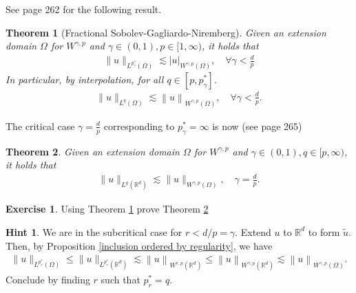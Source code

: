 \documentclass[
    a4paper,
    DIV=14,
    abstract=true,
    numbers=noenddot
]
{scrartcl}
\newtheorem{theorem}{Theorem}[section]
\theoremstyle{definition}
\newtheorem{exercise}{Exercise}
\newtheorem*{hint}{Hint}
\newcommand{\tl}[1]{\widetilde{#1}}
\renewcommand{\norm}[1]{\left\lVert #1 \right\rVert}\renewcommand{\abs}[1]{\left| #1 \right|}
\newcommand{\R}{\mathbb{R}}
\begin{document}
See \cite{leoni2023first} page 262 for the following result.
\begin{theorem}[Fractional Sobolev-Gagliardo-Niremberg]\label{subcritical embedding}
  Given an extension domain $\Omega $ for $W^{\gamma,p}$ and $\gamma \in (0,1), p \in [1,\infty)$, it holds that
  \begin{align*}
    \|u\|_{L^{p_\gamma^*}(\Omega )} \lesssim |u|_{W^{\gamma, p}(\Omega )}, \quad\forall \gamma <  \frac{d}{p}
  \end{align*}
  In particular, by interpolation, for all $q \in [p,p_\gamma^*]$.
  \begin{align*}
    \|u\|_{L^{q}(\Omega )} \lesssim \norm{u}_{W^{\gamma, p}(\Omega )}, \quad\forall \gamma <  \frac{d}{p}.
  \end{align*}
\end{theorem}
The critical case $\gamma=\frac{d}{p}$ corresponding to $p_\gamma^*=\infty$ is now (see \cite{leoni2023first} page 265)
\begin{theorem}\label{critical embedding}
  Given an extension domain $\Omega $ for $W^{\gamma,p}$ and  $\gamma \in (0,1), q \in [p,\infty)$, it holds that
  \begin{align*}
    \|u\|_{L^q(\R^d)} \lesssim\|u\|_{W^{\gamma, p}(\Omega)}, \quad \gamma =  \frac{d}{p}.
  \end{align*}
\end{theorem}
\begin{exercise}
  Using Theorem \ref{subcritical embedding} prove Theorem \ref{critical embedding}
\end{exercise}
\begin{hint}
  We are in the subcritical case for $r<d/p=\gamma$. Extend $u$ to $\R^d$ to form $\tl{u}$. Then, by Proposition \ref{inclusion ordered by regularity}, we have
  \begin{align*}
    \|u\|_{L^{p_r^*}(\Omega )}\leq \|u\|_{L^{p_r^*}(\R^d )}  \lesssim \norm{u}_{W^{r, p}(\R^d )}\leq \norm{u}_{W^{\gamma, p}(\R^d  )}\lesssim \norm{u}_{W^{\gamma, p}(\Omega )}.
  \end{align*}
  Conclude by finding $r$ such that $p_r^*=q$.
\end{hint}
\end{document}
